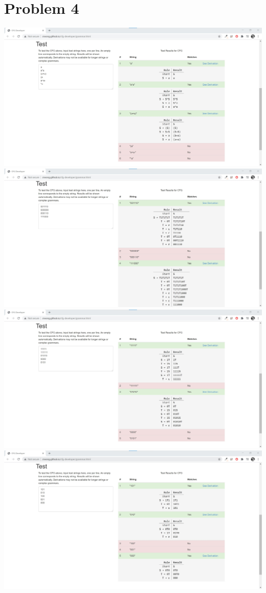 \documentclass{article}
\newenvironment{problem}[1]{
  \nobreak\section*{Problem #1}
}{}
\begin{document}
  \begin{problem}{4}
    \begin{center}
      \includegraphics[scale=0.298]{images/L1.jpg}
      \includegraphics[scale=0.298]{images/L2.jpg}
      \includegraphics[scale=0.298]{images/L3.jpg}
      \includegraphics[scale=0.298]{images/L4.jpg}

\end{center}
\end{problem}
\end{document}
